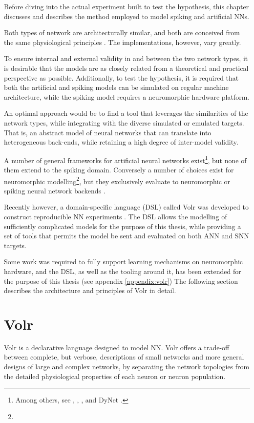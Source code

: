 Before diving into the actual experiment built to test the hypothesis, this
chapter discusses and describes the method employed to model spiking
and artificial \gls{NN}s.

Both types of network are architecturally similar, and both are conceived from
the same physiological principles \autocite{dayan2001, russel2007, Nilsson2009, schmidhuber2014}.
The implementations, however, vary greatly.

To ensure internal and external validity in and between the two network types,
it is desirable that the models are as closely related from a theoretical and
practical perspective as possible.
Additionally, to test the hypothesis, it is required that both the artificial
and spiking models can be simulated on regular machine architecture, while
the spiking model requires a neuromorphic hardware platform.

An optimal approach would be to find a tool that leverages the similarities
of the network types, while integrating with the diverse simulated or emulated
targets.
That is, an abstract model of neural networks that can translate into
heterogeneous back-ends, while retaining a high degree of inter-model validity.

A number of general frameworks for artificial neural networks
exist\footnote{
  Among others, see \autocite{ONNX2018}, \autocite{PyTorch2018}, \autocite{TensorFlow2018},
  \autocite{Keras2018} and DyNet \autocite{Neubig2017}.
}, but none of them extend to the spiking domain.
Conversely a number of choices exist for neuromorphic modelling\footnote{
}, but they exclusively evaluate to neuromorphic or spiking neural network
backends \autocite{Jordan2018}.

Recently however, a domain-specific language (DSL) called Volr was developed
to construct reproducible \gls{NN} experiments
\autocite{Pedersen2018:volr}.
The DSL allows the modelling of sufficiently complicated models for
the purpose of this thesis, while providing a set of tools that permits the
model be sent and evaluated on both \gls{ANN} and \gls{SNN} targets.

Some work was required to fully support learning mechanisms on
neuromorphic hardware, and the DSL, as well as the tooling around it, has been
extended for the purpose of this thesis (see appendix \ref{appendix:volr})
The following section describes the architecture and principles of Volr in
detail.

\section{Volr}
Volr is a declarative language designed to model \gls{NN}.
Volr offers a trade-off between complete, but verbose, descriptions of small
networks and more general designs of large and complex networks, by separating
the network topologies from the detailed physiological properties of each
neuron or neuron population.

